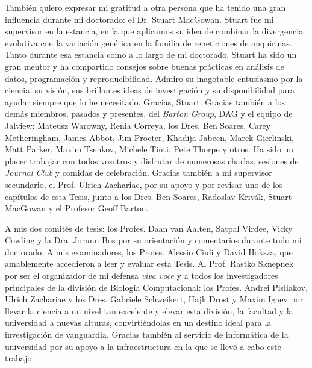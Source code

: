 También quiero expresar mi gratitud a otra persona que ha tenido una gran influencia durante mi doctorado: el Dr. Stuart MacGowan. Stuart fue mi supervisor en la estancia, en la que aplicamos su idea de combinar la divergencia evolutiva con la variación genética en la familia de repeticiones de anquirinas. Tanto durante esa estancia como a lo largo de mi doctorado, Stuart ha sido un gran mentor y ha compartido consejos sobre buenas prácticas en análisis de datos, programación y reproducibilidad. Admiro su inagotable entusiasmo por la ciencia, su visión, sus brillantes ideas de investigación y su disponibilidad para ayudar siempre que lo he necesitado. Gracias, Stuart. Gracias también a los demás miembros, pasados y presentes, del \textit{Barton Group}, DAG y el equipo de Jalview: Mateusz Warowny, Renia Correya, los Dres. Ben Soares, Carey Metheringham, James Abbot, Jim Procter, Khadija Jabeen, Marek Gierlinski, Matt Parker, Maxim Tsenkov, Michele Tinti, Pete Thorpe y otros. Ha sido un placer trabajar con todos vosotros y disfrutar de numerosas charlas, sesiones de \textit{Journal Club} y comidas de celebración. Gracias también a mi supervisor secundario, el Prof. Ulrich Zachariae, por su apoyo y por revisar uno de los capítulos de esta Tesis, junto a los Dres. Ben Soares, Radoslav Krivák, Stuart MacGowan y el Profesor Geoff Barton.

A mis dos comités de tesis: los Profes. Daan van Aalten, Satpal Virdee, Vicky Cowling y la Dra. Jorunn Bos por su orientación y comentarios durante todo mi doctorado. A mis examinadores, los Profes. Alessio Ciuli y David Hoksza, que amablemente accedieron a leer y evaluar esta Tesis. Al Prof. Rastko Sknepnek por ser el organizador de mi defensa \textit{viva voce} y a todos los investigadores principales de la división de Biología Computacional: los Profes. Andrei Pisliakov, Ulrich Zachariae y los Dres. Gabriele Schweikert, Hajk Drost y Maxim Igaev por llevar la ciencia a un nivel tan excelente y elevar esta división, la facultad y la universidad a nuevas alturas, convirtiéndolas en un destino ideal para la investigación de vanguardia. Gracias también al servicio de informática de la universidad por su apoyo a la infraestructura en la que se llevó a cabo este trabajo.

